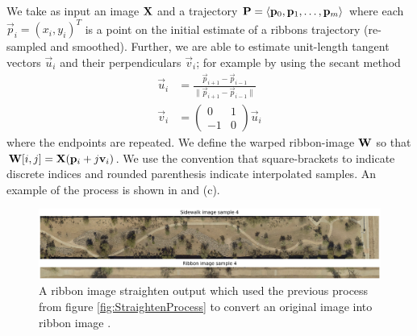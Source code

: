 We take as input an image $\mathbf{X}{}$ and a trajectory $\mathbf{P}{}=\langle \mathbf{p}_0, \mathbf{p}_1,\dots,\mathbf{p}_m\rangle$ where each $\vec{p}_i=(x_i, y_i)^T$ is a point on the initial estimate of a ribbons trajectory (re-sampled and smoothed). 
Further, we are able to estimate unit-length tangent vectors $\vec{u}_i$ and their perpendiculars $\vec{v}_i$; for example by using the secant method 
\begin{align}
  \vec{u}_i &= \frac{\vec{p}_{i+1}-\vec{p}_{i-1}}{\|\vec{p}_{i+1}-\vec{p}_{i-1}\|} \\
  \vec{v}_i &= \left(\begin{array}{cc}
       0  & 1 \\
       -1 & 0
  \end{array} \right) \vec{u}_i
\end{align}
where the endpoints are repeated. 
We define the warped ribbon-image $\mathbf{W}{}$ so that $\mathbf{W}{[i,j]}=\mathbf{X}{}(\mathbf{p}_i+ j \mathbf{v}_i)$. 
We use the convention that square-brackets to indicate discrete indices and rounded parenthesis indicate interpolated samples. 
An example of the process is shown in  and (c). 

\begin{figure}[H]
    \centering
    \includegraphics[width=\textwidth]{Figures/Sample4_needed.png}
    \caption[Sample Sidewalk 1]{A ribbon image straighten output which used the previous process from figure \ref{fig:StraightenProcess} to convert an original image into ribbon image .}
    \label{fig:Sample_Sidewalk_4}
\end{figure}


